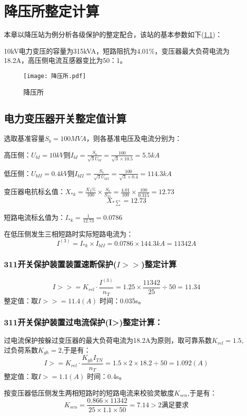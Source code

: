\chapter{降压所整定计算}
本章以降压站为例分析各级保护的整定配合，该站的基本参数如下(\ref{降压所})：\par 
10kV电力变压的容量为315kVA，短路阻抗为4.01\%，变压器最大负荷电流为18.2A，高压侧电流互感器变比为50：1。

\begin{figure}[h] %
	\centering %
	\texttt{[image: 降压所.pdf]} %
	\caption{降压所} %
	\label{降压所} %
\end{figure}
\section{电力变压器开关整定值计算}
选取基准容量$S_{b}=100MVA$，则各基准电压及电流分别为：\par 
高压侧：$U_{bI}=10kV$则$I_{bI}=\frac{S_b}{\sqrt{3}U_{bI}}=\frac{100}{\sqrt{3}\times 10.5}=5.5kA$\par 
低压侧：$U_{bII}=0.4kV$则$I_{bII}=\frac{S_b}{\sqrt{3}U_{bII}}=\frac{100}{\sqrt{3}\times 0.4}=114.3kA$\par  
变压器电抗标幺值：$X_{*k}=\frac{X_T\%}{100}\times \frac{S_b}{S_{T1}}=\frac{4.01}{100}\times \frac{100}{0.315}=12.73$
$$X_{*\sum{}}=12.73$$\par 
短路电流标幺值为：$I_{*k}=\frac{1}{12.73}=0.0786$\par 
在低压侧发生三相短路时实际短路电流为：$$ I^{\left( 3 \right)}=I_{*k}\times I_{bII}=0.0786\times 144.3kA=11342A $$
\subsection{311开关保护装置装置速断保护($I>>$)整定计算}
$$
I>>=K_{rel}\cdot \frac{I^{\left( 3 \right)}}{n_T}=1.25\times \frac{11342}{25}\div 50=11.34
$$
整定值：取$I>>=11.4(A)$\newline 
时间：0.035s。
\subsection{311开关保护装置过电流保护(I>)整定计算：}
过电流保护按躲过变压器的最大负荷电流为18.2A为原则，取可靠系数$K_{rel}=1.5$,过负荷系数$K_{gh}=2$,于是有：
$$
I>=K_{rel}\cdot \frac{K_{gh}I_{TN}}{n_T}=1.5\times 2\times 18.2\div 50=1.092\left( A \right) 
$$
整定值：取$I>=1.1(A)$\newline 
时间：0.4s。\par 
按变压器低压侧发生两相短路时的短路电流来校验灵敏度$K_{sen}$,于是有：
$$
K_{sen}=\frac{0.866\times 11342}{25\times 1.1\times 50}=7.14>2  \text{满足要求}
$$
